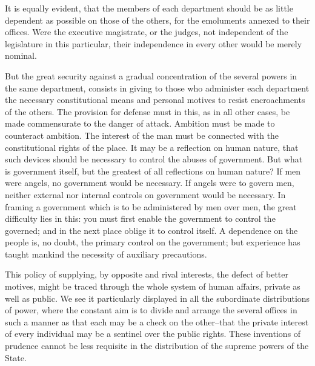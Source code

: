 It is equally evident, that the members of each department should be as little dependent as possible on those of the others, for the emoluments annexed to their offices. 
Were the executive magistrate, or the judges, not independent of the legislature in this particular, their independence in every other would be merely nominal.

But the great security against a gradual concentration of the several powers in the same department, consists in giving to those who administer each department the necessary constitutional means and personal motives to resist encroachments of the others. 
The provision for defense must in this, as in all other cases, be made commensurate to the danger of attack. 
Ambition must be made to counteract ambition. 
The interest of the man must be connected with the constitutional rights of the place. 
It may be a reflection on human nature, that such devices should be necessary to control the abuses of government. 
But what is government itself, but the greatest of all reflections on human nature? 
If men were angels, no government would be necessary. 
If angels were to govern men, neither external nor internal controls on government would be necessary. 
In framing a government which is to be administered by men over men, the great difficulty lies in this: you must first enable the government to control the governed; and in the next place oblige it to control itself. 
A dependence on the people is, no doubt, the primary control on the government; but experience has taught mankind the necessity of auxiliary precautions.

This policy of supplying, by opposite and rival interests, the defect of better motives, might be traced through the whole system of human affairs, private as well as public. 
We see it particularly displayed in all the subordinate distributions of power, where the constant aim is to divide and arrange the several offices in such a manner as that each may be a check on the other--that the private interest of every individual may be a sentinel over the public rights. 
These inventions of prudence cannot be less requisite in the distribution of the supreme powers of the State.

